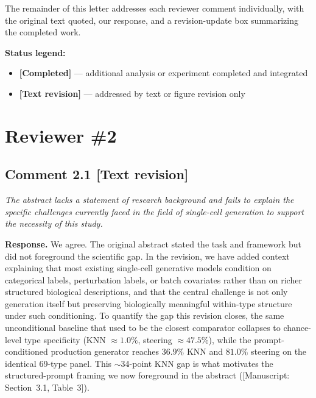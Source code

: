 \documentclass[11pt,letterpaper]{article}
\newcommand{\statuscompleted}{\textcolor{statusgreen}{\textbf{[Completed]}}}
\newcommand{\statustext}{\textcolor{statusblue}{\textbf{[Text revision]}}}
\newcommand{\msref}[1]{\textcolor{blue!60!black}{\textsf{[Manuscript: #1]}}}
\begin{document}
The remainder of this letter addresses each reviewer comment individually, with the original text quoted, our response, and a revision-update box summarizing the completed work.

\vspace{0.4em}
\noindent\textbf{Status legend:}
\begin{itemize}
  \item \statuscompleted{} --- additional analysis or experiment completed and integrated
  \item \statustext{} --- addressed by text or figure revision only
\end{itemize}

\newpage

\section*{Reviewer \#2}

\subsection*{Comment 2.1 \hfill \statustext}

\begin{reviewercomment}
\itshape
The abstract lacks a statement of research background and fails to explain the specific challenges currently faced in the field of single-cell generation to support the necessity of this study.
\end{reviewercomment}

\noindent\textbf{Response.}
We agree. The original abstract stated the task and framework but did not foreground the scientific gap. In the revision, we have added context explaining that most existing single-cell generative models condition on categorical labels, perturbation labels, or batch covariates rather than on richer structured biological descriptions, and that the central challenge is not only generation itself but preserving biologically meaningful within-type structure under such conditioning. To quantify the gap this revision closes, the same unconditional baseline that used to be the closest comparator collapses to chance-level type specificity (KNN $\approx 1.0\%$, steering $\approx 47.5\%$), while the prompt-conditioned production generator reaches $36.9\%$ KNN and $81.0\%$ steering on the identical 69-type panel. This $\sim$34-point KNN gap is what motivates the structured-prompt framing we now foreground in the abstract (\msref{Section~3.1, Table~3}).
\end{document}
